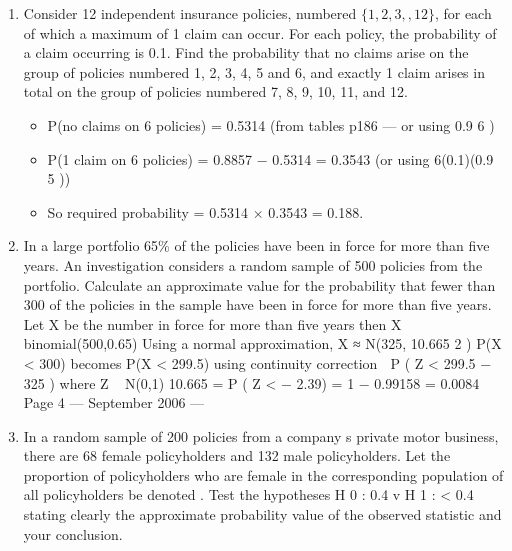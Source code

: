 \documentclass[a4paper,12pt]{article}
\begin{document}
\begin{enumerate}
\item 
Consider 12 independent insurance policies, numbered $\{1, 2, 3, , 12\}$, for each of which a maximum of 1 claim can occur. For each policy, the probability of a claim
occurring is 0.1.
Find the probability that no claims arise on the group of policies numbered 1, 2, 3, 4, 5 and 6, and exactly 1 claim arises in total on the group of policies numbered 7, 8, 9, 10, 11, and 12.

\newpage
\begin{itemize}
\item P(no claims on 6 policies) = 0.5314 (from tables p186 — or using 0.9 6 )
\item P(1 claim on 6 policies) = 0.8857 − 0.5314 = 0.3543 (or using 6(0.1)(0.9 5 ))
\item So required probability = 0.5314 × 0.3543 = 0.188.
\end{itemize}
\newpage
\item In a large portfolio 65\% of the policies have been in force for more than five years. An investigation considers a random sample of 500 policies from the portfolio.
Calculate an approximate value for the probability that fewer than 300 of the policies in the sample have been in force for more than five years.
Let X be the number in force for more than five years
then X ~ binomial(500,0.65)
Using a normal approximation, X ≈ N(325, 10.665 2 )
P(X < 300) becomes P(X < 299.5) using continuity correction
 P ( Z <
299.5 − 325
) where Z ~ N(0,1)
10.665
= P ( Z < − 2.39) = 1 − 0.99158 = 0.0084
Page 4  — September 2006 — 
\item 
In a random sample of 200 policies from a company s private motor business, there are 68 female policyholders and 132 male policyholders.
Let the proportion of policyholders who are female in the corresponding population of all policyholders be denoted .
Test the hypotheses
H 0 :
0.4 v H 1 :
< 0.4
stating clearly the approximate probability value of the observed statistic and your conclusion.
\end{enumerate}
\newpage

\end{document}
